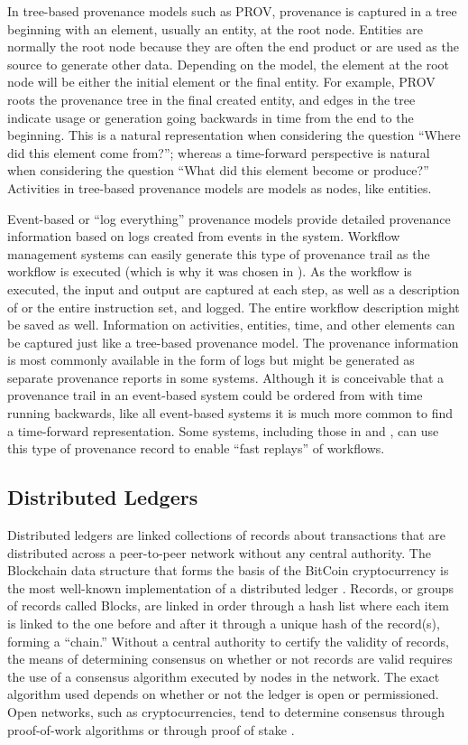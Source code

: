 In tree-based provenance models such as PROV, provenance is captured in a tree beginning with an element, usually an entity, at the root node. Entities are normally the root node because they are often the end product or are used as the source to generate other data. Depending on the model, the element at the root node will be either the initial element or the final entity. For example, PROV roots the provenance tree in the final created entity, and edges in the tree indicate usage or generation going backwards in time from the end to the beginning. This is a natural representation when considering the question ``Where did this element come from?''; whereas a time-forward perspective is natural when considering the question ``What did this element become or produce?'' Activities in tree-based provenance models are models as nodes, like entities.

Event-based or ``log everything'' provenance models provide detailed provenance information based on logs created from events in the system. Workflow management systems can easily generate this type of provenance trail as the workflow is executed (which is why it was chosen in \cite{billings_eclipse_2017}). As the workflow is executed, the input and output are captured at each step, as well as a description of or the entire instruction set, and logged. The entire workflow description might be saved as well. Information on activities, entities, time, and other elements can be captured just like a tree-based provenance model. The provenance information is most commonly available in the form of logs but might be generated as separate provenance reports in some systems. Although it is conceivable that a provenance trail in an event-based system could be ordered from with time running backwards, like all event-based systems it is much more common to find a time-forward representation. Some systems, including those in \cite{billings_eclipse_2017} and \cite{altintas_provenance_2006}, can use this type of provenance record to enable ``fast replays'' of workflows.

\subsection{Distributed Ledgers}
Distributed ledgers are linked collections of records about transactions that are distributed across a peer-to-peer network without any central authority. The Blockchain data structure that forms the basis of the BitCoin cryptocurrency is the most well-known implementation of a distributed ledger \cite{nakamoto_bitcoin:_nodate}. Records, or groups of records called Blocks, are linked in order through a hash list where each item is linked to the one before and after it through a unique hash of the record(s), forming a ``chain.'' Without a central authority to certify the validity of records, the means of determining consensus on whether or not records are valid requires the use of a consensus algorithm executed by nodes in the network. The exact algorithm used depends on whether or not the ledger is open or permissioned. Open networks, such as cryptocurrencies, tend to determine consensus through proof-of-work algorithms \cite{nakamoto_bitcoin:_nodate} or through proof of stake \cite{noauthor_proof--stake_2018}.

